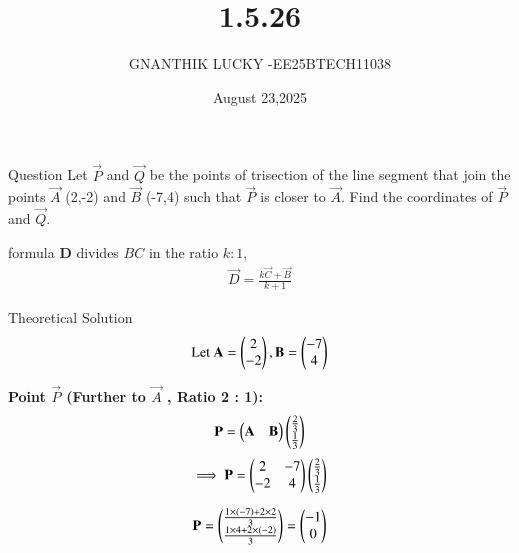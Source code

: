 \documentclass{beamer}
\begin{document}
\title 
{1.5.26}
\date{August 23,2025}


\author 
{GNANTHIK LUCKY -EE25BTECH11038}






\frame{\titlepage}
\begin{frame}{Question}
Let  $\vec{P}$ and $\vec{Q}$ be the points of trisection of the line segment that join the points  $\vec{A}$ (2,-2) and  $\vec{B}$ (-7,4) such that  $\vec{P}$ is closer to  $\vec{A}$. Find the coordinates of  $\vec{P}$ and  $\vec{Q}$.
\end{frame}

\begin{frame}{formula}
 \textbf{D} divides $BC$ in the ratio $k : 1$, 
\begin{align}
        \vec{D} = \frac{k\vec{C} + \vec{B}}{k + 1}
\end{align}
\end{frame}


\begin{frame}{Theoretical Solution}
\begin{align}
\text{Let } 
\mathbf{A} = \begin{pmatrix} 2 \\ -2 \end{pmatrix},
\mathbf{B} = \begin{pmatrix} -7 \\ 4 \end{pmatrix}
\end{align}


\textbf{Point  $\vec{P}$  (Further to  $\vec{A}$ , Ratio 2 : 1):}
\begin{align}
    \vec{P}=\begin{myvec}{\vec{A}& \vec{B}}\end{myvec}\begin{myvec}
        {\frac{2}{3}\\\frac{1}{3}}\end{myvec}    
\end{align}
\begin{align}
\implies \vec{P}=\begin{myvec}{ 2 & -7\\ -2 & 4 }\end{myvec}\begin{myvec}
        {\frac{2}{3}\\\frac{1}{3}}\end{myvec}\\
\end{align}


\begin{align}
\vec{P} = \begin{myvec}{
\frac{1 \times (-7) + 2 \times 2}{3} \\
\frac{1 \times 4 + 2 \times (-2)}{3}
}\end{myvec}
= \begin{myvec}{ -1 \\ 0 }\end{myvec}
\end{align}
\end{frame}
\end{document}
